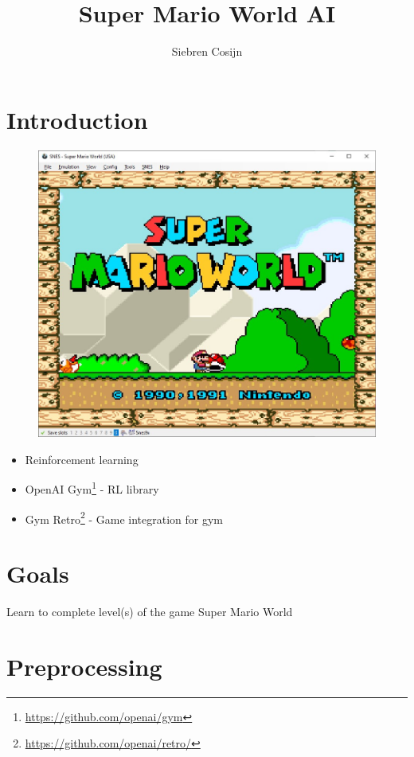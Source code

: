 \documentclass{article}
\title{Super Mario World AI}
\author{Siebren Cosijn}
\begin{document}
    \maketitle

    \section{Introduction}
    \begin{figure}[H]
    \centering
    \includegraphics[width=.85\textwidth]{start-screen}
    \end{figure}
    \begin{itemize}
        \item Reinforcement learning
        \item OpenAI Gym\footnote{\url{https://github.com/openai/gym}} - RL library
        \item Gym Retro\footnote{\url{https://github.com/openai/retro/}} - Game integration for gym
    \end{itemize}

    \section{Goals}
    Learn to complete level(s) of the game Super Mario World

    \section{Preprocessing}
\end{document}
